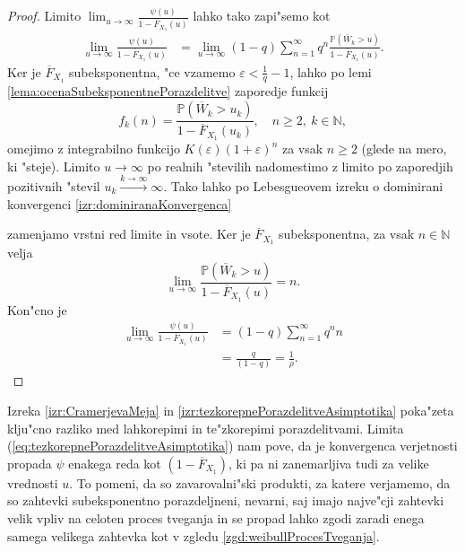 \documentclass[12pt, a4paper, reqno]{amsart}
\theoremstyle{definition}
\theoremstyle{plain}
\newcommand{\N}{\mathbb{N}}
\newcommand{\Prob}{\mathbb{P}}
\newcommand{\1}{\mathds{1}}
\newcommand*{\refPriloga}[1]{%
  \begingroup
    \hypersetup{
      linkcolor=red,
      linkbordercolor=red,
    }%
    \ref{#1}%
  \endgroup
}
\begin{document}
\begin{proof}
            \noindent
            Limito $\lim_{u\to\infty}\frac{\psi(u)}{1 - \overline{F}_{X_1}(u)}$ lahko tako zapi"semo kot
            \begin{align*}
                \lim_{u\to\infty}\frac{\psi(u)}{1 - \overline{F}_{X_1}(u)}   &= \lim_{u\to\infty}(1 - q)\sum_{n=1}^{\infty}q^n\frac{\Prob\left(\overline{W}_k > u\right)}{1 - \overline{F}_{X_1}(u)}.
            \end{align*}
            Ker je $\overline{F}_{X_1}$ subeksponentna, "ce vzamemo $\varepsilon < \frac{1}{q} - 1$, 
            lahko po lemi \ref{lema:ocenaSubeksponentnePorazdelitve} zaporedje funkcij 
            \begin{equation*}
                f_k(n) = \frac{\Prob\left(\overline{W}_k > u_k\right)}{1 - \overline{F}_{X_1}(u_k)}, \quad n\geq 2,\ k\in\N, 
            \end{equation*}
            omejimo z integrabilno funkcijo $K(\varepsilon)(1 + \varepsilon)^n$ za vsak $n\geq 2$ (glede na mero, ki "steje). Limito $u\to\infty$ po 
            realnih "stevilih nadomestimo z limito po zaporedjih pozitivnih "stevil $u_k\xrightarrow{k\to\infty}\infty$.
            Tako lahko po Lebesgueovem izreku o dominirani konvergenci \refPriloga{izr:dominiranaKonvergenca}
            zamenjamo vrstni red limite in vsote.
            Ker je $\overline{F}_{X_1}$ subeksponentna, za vsak $n\in\N$ velja
            \begin{equation*}
                \lim_{u\to\infty}\frac{\Prob\left(\overline{W}_k > u\right)}{1 - \overline{F}_{X_1}(u)} = n.
            \end{equation*}
            Kon"cno je
            \begin{align*}
                \lim_{u\to\infty}\frac{\psi(u)}{1 - \overline{F}_{X_1}(u)} &= (1 - q)\sum_{n=1}^\infty q^nn \\
                                 &= \frac{q}{(1 - q)} =  \frac{1}{\rho}.
            \end{align*}
        \end{proof}

        Izreka \ref{izr:CramerjevaMeja} in \ref{izr:tezkorepnePorazdelitveAsimptotika} poka"zeta klju"cno 
        razliko med lahkorepimi in te"zkorepimi porazdelitvami. Limita (\ref{eq:tezkorepnePorazdelitveAsimptotika})
        nam pove, da je konvergenca verjetnosti propada $\psi$ enakega reda kot $(1 - \overline{F}_{X_1})$, ki pa 
        ni zanemarljiva tudi za velike vrednosti $u$. To pomeni, da so zavarovalni"ski produkti, za katere 
        verjamemo, da so zahtevki subeksponentno porazdeljneni, nevarni, saj imajo najve"cji zahtevki velik 
        vpliv na celoten proces tveganja in se propad lahko zgodi zaradi enega samega velikega
        zahtevka kot v zgledu \ref{zgd:weibullProcesTveganja}.
\end{document}
